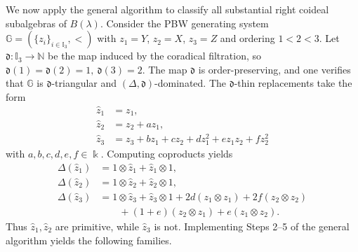 \documentclass{article}
\theoremstyle{plain}
\theoremstyle{definition}
\numberwithin{equation}{section}
\newcommand{\GG}{\mathbb{G}}
\newcommand{\II}{\mathbb{I}}
\newcommand{\dd}{\mathfrak{d}}
\begin{document}
	We now apply the general algorithm to classify all substantial right coideal subalgebras of $B(\lambda)$. Consider the PBW generating system $\GG=(\{z_{i}\}_{i\in\II_{3}},<)$ with
	$z_{1}=Y$, $z_{2}=X$, $z_{3}=Z$ and ordering $1<2<3$.
	Let $\dd\colon\II_{3} \to \mathbb{N}$ be the map induced by the coradical filtration, so $\dd(1)=\dd(2)=1,\ \dd(3)=2$. The map $\dd$ is order-preserving, and one verifies that $\GG$ is $\dd$-triangular and $(\Delta,\dd)$-dominated.
	The $\dd$-thin replacements take the form
	\[
	\begin{aligned}
		\hat z_{1} &= z_{1},\\
		\hat z_{2} &= z_{2} + a z_{1},\\
		\hat z_{3} &= z_{3} + bz_{1} + cz_{2} + dz_{1}^{2} + ez_{1}z_{2} + fz_{2}^{2}
	\end{aligned}
	\]
	with $a,b,c,d,e,f \in \Bbbk$.
	Computing coproducts yields
	\[
	\begin{aligned}
		\Delta(\hat z_{1}) &= 1\otimes\hat z_{1} + \hat z_{1}\otimes1,\\
		\Delta(\hat z_{2}) &= 1\otimes\hat z_{2} + \hat z_{2}\otimes1,\\
		\Delta(\hat z_{3}) &= 1\otimes\hat z_{3} + \hat z_{3}\otimes1
		+ 2d(z_{1}\otimes z_{1}) + 2f(z_{2}\otimes z_{2}) \\
		&\qquad + (1+e)(z_{2}\otimes z_{1}) + e(z_{1}\otimes z_{2}).
	\end{aligned}
	\]
	Thus $\hat z_{1},\hat z_{2}$ are primitive, while $\hat z_{3}$ is not.
	Implementing Steps 2–5 of the general algorithm yields the following families.
\end{document}
